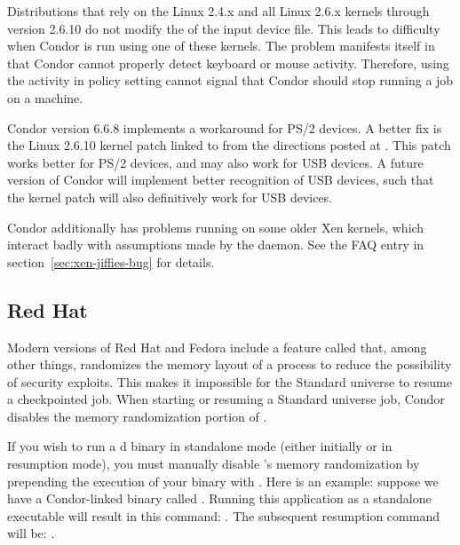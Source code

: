 Distributions that rely on the Linux 2.4.x and all Linux 2.6.x kernels
through version 2.6.10
do not modify the  of the input device file.
This leads to difficulty when Condor is run using one of these
kernels. 
The problem manifests itself in that Condor cannot properly
detect keyboard or mouse activity.
Therefore, using the activity in policy setting cannot
signal that Condor should stop running a job on a machine.

Condor version 6.6.8 implements a workaround for PS/2 devices.
A better fix is the Linux 2.6.10 kernel
patch linked to from the directions posted at
.
This patch works better for PS/2 devices, and
may also work for USB devices.
A future version of Condor will implement better recognition
of USB devices,
such that the kernel patch will also definitively work for USB devices.

Condor additionally has problems running on some older Xen kernels,
which interact badly with assumptions made by the 
daemon. See the FAQ entry in section~\ref{sec:xen-jiffies-bug} for
details.

\subsection{\label{sec:platform-linux-redhat}Red Hat}

Modern versions of Red Hat and Fedora include a feature called
 that, among other things, randomizes the memory
layout of a process
to reduce the possibility of security exploits. This makes it impossible
for the Standard universe to resume a checkpointed job. When starting
or resuming a Standard universe job, Condor disables the memory
randomization portion of .

If you wish to run a d binary in standalone mode
(either initially or in resumption mode), you must manually disable
's memory randomization by prepending the execution
of your binary with .
Here is an example: suppose we have a
Condor-linked binary called . Running this application as a
standalone executable will result in this command: . The subsequent resumption command will be: 
.


